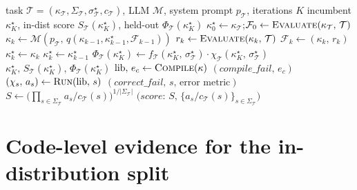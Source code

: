\documentclass{article}
\theoremstyle{plain}
\theoremstyle{definition}
\theoremstyle{remark}
\begin{document}
\begin{algorithm}[t]
\caption{\textsc{Metal-Sci} evolution loop ($\mu{=}1{+}\lambda{=}1$).}
\label{alg:loop}
\begin{algorithmic}[1]
\Require task $\mathcal{T}{=}(\kappa_\mathcal{T},\Sigma_\mathcal{T},\sigma^\star_\mathcal{T},c_\mathcal{T})$, LLM $\mathcal{M}$, system prompt $p_\mathcal{T}$, iterations $K$
\Ensure incumbent $\kappa^\star_K$, in-dist score $S_\mathcal{T}(\kappa^\star_K)$, held-out $\Phi_\mathcal{T}(\kappa^\star_K)$
\State $\kappa^\star_0 \gets \kappa_\mathcal{T}$;\quad $\mathcal{F}_0 \gets \textsc{Evaluate}(\kappa_\mathcal{T},\,\mathcal{T})$ 
  \State $\kappa_k \gets \mathcal{M}\!\left(p_\mathcal{T},\, q(\kappa_{k-1}, \kappa^\star_{k-1}, \mathcal{F}_{k-1})\right)$ 
  \State $r_k \gets \textsc{Evaluate}(\kappa_k,\,\mathcal{T})$
  \State $\mathcal{F}_k \gets (\kappa_k,\, r_k)$ 
    \State $\kappa^\star_k \gets \kappa_k$ 
  \Else
    \State $\kappa^\star_k \gets \kappa^\star_{k-1}$
  \EndIf
\EndFor
\State $\Phi_\mathcal{T}(\kappa^\star_K) \gets f_\mathcal{T}(\kappa^\star_K,\,\sigma^\star_\mathcal{T}) \cdot \chi_\mathcal{T}(\kappa^\star_K,\,\sigma^\star_\mathcal{T})$ 
\State \Return $\kappa^\star_K,\, S_\mathcal{T}(\kappa^\star_K),\, \Phi_\mathcal{T}(\kappa^\star_K)$
\Statex
{}
  \State $\mathrm{lib},\, e_c \gets \textsc{Compile}(\kappa)$
  \; \Return $(\mathit{compile\_fail},\, e_c)$ \EndIf
    \State $(\chi_s,\, a_s) \gets \textsc{Run}(\mathrm{lib},\, s)$
    \; \Return $(\mathit{correct\_fail},\, s,\, \text{error metric})$ \EndIf
  \EndFor
  \State $S \gets \big(\textstyle\prod_{s\in\Sigma_\mathcal{T}} a_s/c_\mathcal{T}(s)\big)^{1/|\Sigma_\mathcal{T}|}$
  \State \Return $\big(\mathit{score}{:}\,S,\,\{a_s/c_\mathcal{T}(s)\}_{s\in\Sigma_\mathcal{T}}\big)$
\EndFunction
\end{algorithmic}
\end{algorithm}

\section{Code-level evidence for the in-distribution split}
\label{app:code}
\end{document}
